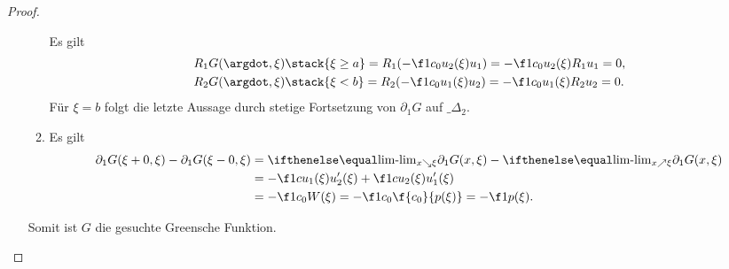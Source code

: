 \begin{st}
\begin{proof}
\begin{seg}[(ii)$\implies$(i)]
\begin{itemize}
\begin{enumerate}[1)]
							Es gilt
							\begin{align*}
								R_1 G(\argdot, \xi) &\stack{\xi \ge a}= R_1 (-\f 1{c_0} u_2(\xi) u_1) = -\f 1{c_0} u_2(\xi) R_1u_1 = 0, \\
								R_2 G(\argdot, \xi) &\stack{\xi < b}= R_2 (-\f 1{c_0} u_1(\xi) u_2) = -\f 1{c_0} u_1(\xi) R_2u_2 = 0.
							\end{align*}
							Für $\xi = b$ folgt die letzte Aussage durch stetige Fortsetzung von $\partial_1 G $ auf $\_{\Delta_2}$.
						\item
							Es gilt
							\begin{align*}
								\partial_1 G(\xi + 0, \xi) - \partial_1 G(\xi - 0, \xi)
								&= \lim_{x \searrow \xi} \partial_1 G(x, \xi) - \lim_{x \nearrow \xi} \partial_1 G(x,\xi) \\
								&= - \f 1{c} u_1(\xi) u_2'(\xi) + \f 1c u_2(\xi) u_1'(\xi) \\
								&= - \f 1{c_0} W(\xi)
								= - \f 1{c_0} \f {c_0}{p(\xi)} = - \f 1{p(\xi)}.
							\end{align*}
					\end{enumerate}
					Somit ist $G$ die gesuchte Greensche Funktion.
			\end{itemize}
		\end{seg}
	\end{proof}
\end{st}

